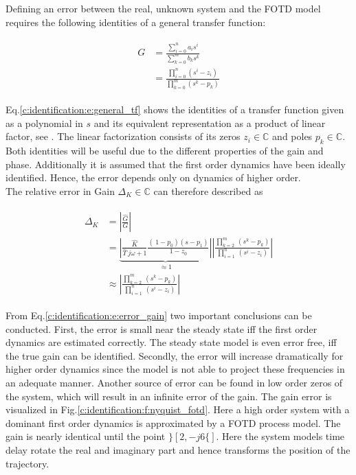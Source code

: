 Defining an error between the real, unknown system and the FOTD model requires the following identities of a general transfer function:

\begin{align}
\begin{split}
G &=  \frac{\sum_{i=0}^n a_i s^i}{\sum_{k=0}^m b_k s^k} \\
&= \frac{\prod_{i=0}^n \left( s^i - z_i \right)}{\prod_{k=0}^m \left( s^k-p_k\right)} 
\end{split}
\label{c:identification:e:general_tf}
\end{align}

Eq.\ref{c:identification:e:general_tf} shows the identities of a transfer function given as a polynomial in $s$ and its equivalent representation as a product of linear factor, see \cite[p.269 ff.]{Lunze2016}. The linear factorization consists of its zeros $z_i \in \mathbb{C}$ and poles $p_k \in \mathbb{C}$. Both identities will be useful due to the different properties of the gain and phase. Additionally it is assumed that the first order dynamics have been ideally identified. Hence, the error depends only on dynamics of higher order.\\

The relative error in Gain $\Delta_K \in \mathbb{C}$ can therefore described as

\begin{align}
\begin{split}
\Delta_K &= \left| \frac{\hat{G}}{G}\right| \\
&= \underbrace{\left|\frac{\hat{K}}{\hat{T}~j\omega+1} \frac{\left(\ 1-p_0 \right)\left( s- p_1 \right)}{1-z_0} \right|}_{\approx 1} \left| \frac{\prod_{k=2}^m~(s^k-p_k)}{\prod_{i=1}^n~(s^i-z_i)} \right| \\
&\approx \left| \frac{\prod_{k=2}^m~(s^k-p_k)}{\prod_{i=1}^n~(s^i-z_i)} \right|
\end{split}
\label{c:identification:e:error_gain}
\end{align}

From Eq.\ref{c:identification:e:error_gain} two important conclusions can be conducted. First, the error is small near the steady state iff the first order dynamics are estimated correctly. The steady state model is even error free, iff the true gain can be identified. Secondly, the error will increase dramatically for higher order dynamics since the model is not able to project these frequencies in an adequate manner. Another source of error can be found in low order zeros of the system, which will result in an infinite error of the gain. The gain error is visualized in Fig.\ref{c:identification:f:nyquist_fotd}. Here a high order system with a dominant first order dynamics is approximated by a FOTD process model. The gain is nearly identical until the point $\rbrace[2,-j6\lbrace]$. Here the system models time delay rotate the real and imaginary part and hence transforms the position of the trajectory. \\

